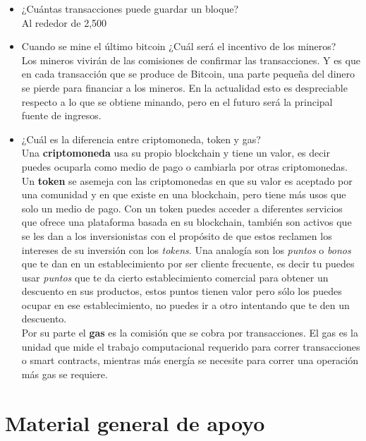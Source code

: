 \documentclass[a4paper,12pt]{lib/pub}
\begin{document}
\begin{itemize}
	\item ¿Cuántas transacciones puede guardar un bloque?\\
	Al rededor de 2,500
	\item Cuando se mine el último bitcoin ¿Cuál será el incentivo de los mineros?\\
	Los mineros vivirán de las comisiones de confirmar las transacciones. Y es que en cada transacción que se produce de Bitcoin, una parte pequeña del dinero se pierde para financiar a los mineros. En la actualidad esto es despreciable respecto a lo que se obtiene minando, pero en el futuro será la principal fuente de ingresos.
	\item ¿Cuál es la diferencia entre criptomoneda, token y gas?\\
	Una \textbf{criptomoneda} usa su propio blockchain y tiene un valor, es decir puedes ocuparla como medio de pago o cambiarla por otras criptomonedas. \\
	Un \textbf{token} se asemeja con las criptomonedas en que su valor es aceptado por una comunidad y en que existe en una blockchain, pero tiene más usos que solo un medio de pago. Con un token puedes acceder a diferentes servicios que ofrece una plataforma basada en su blockchain, también son activos que se les dan a los inversionistas con el propósito de que estos reclamen los intereses de su inversión con los \textit{tokens}. Una analogía son los \textit{puntos} o \textit{bonos} que te dan en un establecimiento por ser cliente frecuente, es decir tu puedes usar \textit{puntos} que te da cierto establecimiento comercial para obtener un descuento en sus productos, estos puntos tienen valor pero sólo los puedes ocupar en ese establecimiento, no puedes ir a otro intentando que te den un descuento.\\
	Por su parte el \textbf{gas} es la comisión que se cobra por transacciones. El gas es la unidad que mide el trabajo computacional requerido para correr transacciones o smart contracts, mientras más energía se necesite para correr una operación más gas se requiere.
\end{itemize}
\newpage
\section{Material general de apoyo}
\end{document}
